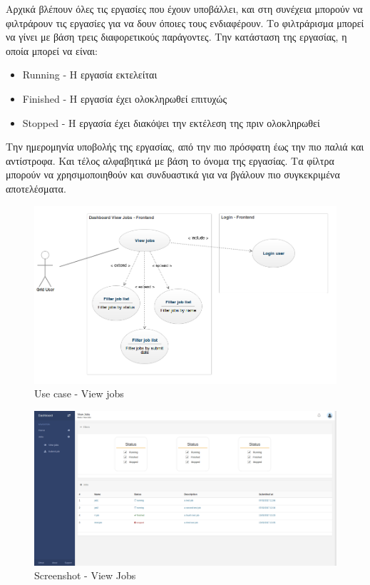 Αρχικά βλέπουν όλες τις εργασίες που έχουν υποβάλλει, και στη συνέχεια μπορούν να φιλτράρουν τις εργασίες για να δουν όποιες τους ενδιαφέρουν.
\newline
Το φιλτράρισμα μπορεί να γίνει με βάση τρεις διαφορετικούς παράγοντες. 
\newline
Την κατάσταση της εργασίας, η οποία μπορεί να είναι:
\begin{itemize}
\item Running - Η εργασία εκτελείται
\item Finished - Η εργασία έχει ολοκληρωθεί επιτυχώς
\item Stopped - Η εργασία έχει διακόψει την εκτέλεση της πριν ολοκληρωθεί
\end{itemize}
Την ημερομηνία υποβολής της εργασίας, από την πιο πρόσφατη έως την πιο παλιά και αντίστροφα.
\newline
Και τέλος αλφαβητικά με βάση το όνομα της εργασίας.
\newline
Τα φίλτρα μπορούν να χρησιμοποιηθούν και συνδυαστικά για να βγάλουν πιο συγκεκριμένα αποτελέσματα.

\begin{figure}[bp!]
\caption{Use case - View jobs}
\includegraphics[width=16cm]{../images/view-jobs-case.png}
\centering
\end{figure}
\clearpage

\begin{figure}[bp!]
\caption{Screenshot - View Jobs}
\includegraphics[width=16cm]{../images/view-jobs-screenshot.png}
\centering
\end{figure}
\clearpage



